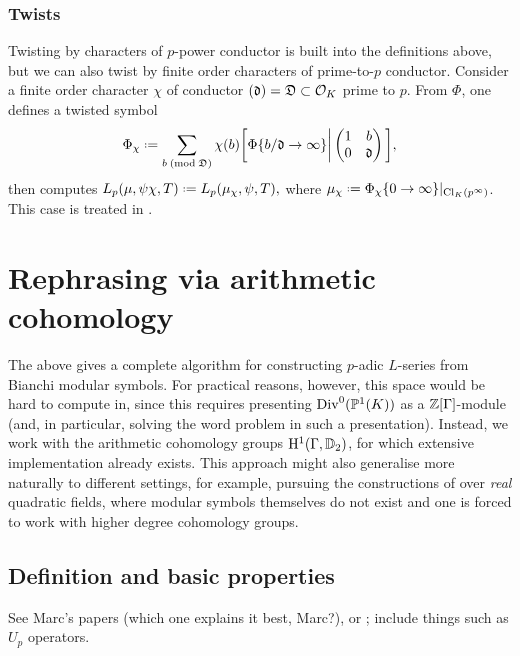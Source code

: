 \documentclass[a4paper,11pt]{article}
\numberwithin{equation}{section}
\begin{document}
\subsubsection{Twists}
Twisting by characters of $p$-power conductor is built into the definitions above, but we can also twist by finite order characters of prime-to-$p$ conductor. Consider a finite order character $\chi$ of conductor $(\mathfrak{d}) = \mathfrak{D} \subset \mathcal{O}_K$ prime to $p$. From $\Phi$, one defines a twisted symbol
\[
	\Phi_\chi \defeq \sum_{b \newmod{\mathfrak{D}}} \chi(b) \bigg[\Phi\{b/\mathfrak{d} \rightarrow \infty\}\bigg| \matrd{1}{b}{0}{\mathfrak{d}}\bigg],
\]
then computes $L_p(\mu,\psi\chi,T) \defeq L_p(\mu_\chi,\psi,T),$ where $\mu_\chi \defeq \Phi_\chi\{0\rightarrow \infty\}|_{\cl_K(p^\infty)}$. This case is treated in \cite[\S3.4]{BW17}.












\section{Rephrasing via arithmetic cohomology}
The above gives a complete algorithm for constructing $p$-adic $L$-series from Bianchi modular symbols. For practical reasons, however, this space would be hard to compute in, since this requires presenting $\mathrm{Div}^0(\mathbb{P}^1(K))$ as a $\mathbb{Z}[\Gamma]$-module (and, in particular, solving the word problem in such a presentation). Instead, we work with the arithmetic cohomology groups $\mathrm{H}^1(\Gamma,\mathbb{D}_2)$, for which extensive implementation already exists. This approach might also generalise more naturally to different settings, for example, pursuing the constructions of \cite{Bar15} over \emph{real} quadratic fields, where modular symbols themselves do not exist and one is forced to work with higher degree cohomology groups.

\subsection{Definition and basic properties}
See Marc's papers (which one explains it best, Marc?), or  \cite{PP09}; include things such as $U_p$ operators.
\end{document}
